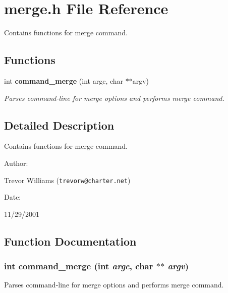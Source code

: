 \section{merge.h File Reference}
\label{merge_8h}
Contains functions for merge command. 


\subsection*{Functions}
\begin{CompactItemize}
\item 
int {\bf command\_\-merge} (int argc, char $\ast$$\ast$argv)
\begin{CompactList}\small\item\em Parses command-line for merge options and performs merge command.\item\end{CompactList}\end{CompactItemize}


\subsection{Detailed Description}
Contains functions for merge command.



\begin{Desc}
\item[Author: ]\par
Trevor Williams ({\tt trevorw@charter.net}) \end{Desc}
\begin{Desc}
\item[Date: ]\par
11/29/2001\end{Desc}


\subsection{Function Documentation}
\subsubsection{\setlength{\rightskip}{0pt plus 5cm}int command\_\-merge (int {\em argc}, char $\ast$$\ast$ {\em argv})}\label{merge_8h_a0}


Parses command-line for merge options and performs merge command.

